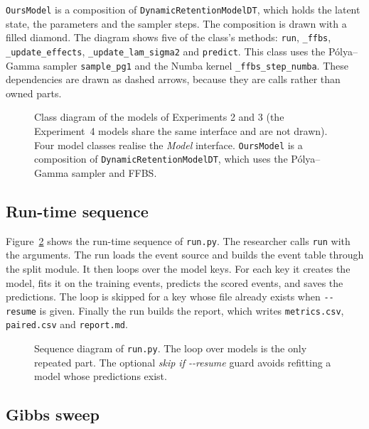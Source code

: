 \texttt{OursModel} is a composition of \texttt{DynamicRetention\allowbreak{}ModelDT}, which holds the latent state, the
parameters and the sampler steps. The composition is drawn with a filled diamond. The diagram shows five of the class's methods: \texttt{run}, \texttt{\_ffbs}, \texttt{\_update\_effects}, \texttt{\_update\_lam\allowbreak\_sigma2} and \texttt{predict}. This class uses the P\'olya--Gamma sampler \texttt{sample\allowbreak\_pg1}
and the Numba kernel \texttt{\allowbreak\_ffbs\allowbreak\_step\allowbreak\_numba}. These dependencies are drawn as dashed arrows, because they are
calls rather than owned parts.

\begin{figure}[htbp]
  \centering
  
  \caption[Class diagram of the model classes]{Class diagram of the models of Experiments 2 and 3 (the Experiment~4 models share the same interface and are not drawn). Four model classes realise the \emph{Model} interface. \texttt{OursModel} is a composition
    of \texttt{DynamicRetention\allowbreak ModelDT}, which uses the P\'olya--Gamma sampler and FFBS.}
  \label{fig:tk_class}
\end{figure}

\subsection{Run-time sequence}

Figure~\ref{fig:tk_sequence} shows the run-time sequence of \texttt{run.py}. The researcher calls \texttt{run} with the
arguments. The run loads the event source and builds the event table through the split module. It then loops over the
model keys. For each key it creates the model, fits it on the training events, predicts the scored events, and saves
the predictions. The loop is skipped for a key whose file already exists when \texttt{-{}-resume} is given. Finally the
run builds the report, which writes \texttt{metrics.csv}, \texttt{paired.csv} and \texttt{report.md}.

\begin{figure}[htbp]
  \centering
  
  \caption{Sequence diagram of \texttt{run.py}. The loop over models is the only repeated part. The optional
    \emph{skip if -{}-resume} guard avoids refitting a model whose predictions exist.}
  \label{fig:tk_sequence}
\end{figure}

\subsection{Gibbs sweep}

